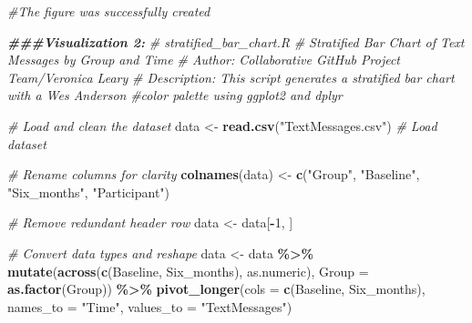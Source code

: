 \documentclass[
]{article}
\newenvironment{Shaded}{\begin{snugshade}}{\end{snugshade}}
\newcommand{\AttributeTok}[1]{\textcolor[rgb]{0.13,0.29,0.53}{#1}}
\newcommand{\CommentTok}[1]{\textcolor[rgb]{0.56,0.35,0.01}{\textit{#1}}}
\newcommand{\DecValTok}[1]{\textcolor[rgb]{0.00,0.00,0.81}{#1}}
\newcommand{\DocumentationTok}[1]{\textcolor[rgb]{0.56,0.35,0.01}{\textbf{\textit{#1}}}}
\newcommand{\FunctionTok}[1]{\textcolor[rgb]{0.13,0.29,0.53}{\textbf{#1}}}
\newcommand{\NormalTok}[1]{#1}
\newcommand{\OtherTok}[1]{\textcolor[rgb]{0.56,0.35,0.01}{#1}}
\newcommand{\SpecialCharTok}[1]{\textcolor[rgb]{0.81,0.36,0.00}{\textbf{#1}}}
\newcommand{\StringTok}[1]{\textcolor[rgb]{0.31,0.60,0.02}{#1}}
\begin{document}
\begin{Shaded}
\begin{Highlighting}[]
\CommentTok{\#The figure was successfully created}
\end{Highlighting}
\end{Shaded}

\begin{Shaded}
\begin{Highlighting}[]
\DocumentationTok{\#\#\#Visualization 2:}
\CommentTok{\# stratified\_bar\_chart.R}
\CommentTok{\# Stratified Bar Chart of Text Messages by Group and Time}
\CommentTok{\# Author: Collaborative GitHub Project Team/Veronica Leary}
\CommentTok{\# Description: This script generates a stratified bar chart with a Wes Anderson }
\CommentTok{\#color palette using ggplot2 and dplyr}

\CommentTok{\# Load and clean the dataset}
\NormalTok{data }\OtherTok{\textless{}{-}} \FunctionTok{read.csv}\NormalTok{(}\StringTok{"TextMessages.csv"}\NormalTok{)  }\CommentTok{\# Load dataset}

\CommentTok{\# Rename columns for clarity}
\FunctionTok{colnames}\NormalTok{(data) }\OtherTok{\textless{}{-}} \FunctionTok{c}\NormalTok{(}\StringTok{"Group"}\NormalTok{, }\StringTok{"Baseline"}\NormalTok{, }\StringTok{"Six\_months"}\NormalTok{, }\StringTok{"Participant"}\NormalTok{)}

\CommentTok{\# Remove redundant header row}
\NormalTok{data }\OtherTok{\textless{}{-}}\NormalTok{ data[}\SpecialCharTok{{-}}\DecValTok{1}\NormalTok{, ]}

\CommentTok{\# Convert data types and reshape}
\NormalTok{data }\OtherTok{\textless{}{-}}\NormalTok{ data }\SpecialCharTok{\%\textgreater{}\%}
  \FunctionTok{mutate}\NormalTok{(}\FunctionTok{across}\NormalTok{(}\FunctionTok{c}\NormalTok{(Baseline, Six\_months), as.numeric),}
         \AttributeTok{Group =} \FunctionTok{as.factor}\NormalTok{(Group)) }\SpecialCharTok{\%\textgreater{}\%}
  \FunctionTok{pivot\_longer}\NormalTok{(}\AttributeTok{cols =} \FunctionTok{c}\NormalTok{(Baseline, Six\_months),}
               \AttributeTok{names\_to =} \StringTok{"Time"}\NormalTok{,}
               \AttributeTok{values\_to =} \StringTok{"TextMessages"}\NormalTok{)}
\end{Highlighting}
\end{Shaded}
\end{document}
